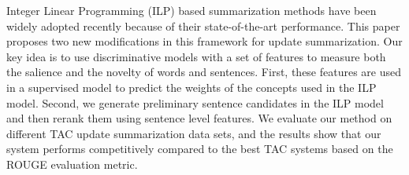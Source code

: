 Integer Linear Programming (ILP) based summarization methods have been widely adopted recently because of their state-of-the-art performance. This paper proposes two new modifications in this framework for update summarization. Our key idea is to use discriminative models with a set of features to measure both the salience and the novelty of words and sentences. First, these features are used in a supervised model to predict the weights of the concepts used in the ILP model. Second, we generate preliminary sentence candidates in the ILP model and then rerank them using sentence level features. We evaluate our method on different TAC update summarization data sets, and the results show that our system performs competitively compared to the best TAC systems based on the ROUGE evaluation metric.
